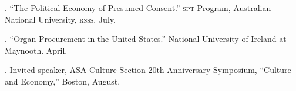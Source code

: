 \documentclass[11pt]{article}
\begin{document}
. ``The Political Economy of Presumed Consent.'' \textsc{spt} Program,
Australian National University, \textsc{rsss}. July. 

. ``Organ Procurement in the United States.'' National University of
Ireland at Maynooth. April. 

% 
% 
% 
% 
% 
% 
% 
% 
% 
% 
% 
% 
% 
% 
% 
% 
% 
% 
% 
% 
% 

\bigskip


\medskip

. Invited speaker, ASA Culture Section 20th Anniversary Symposium, ``Culture and Economy,'' Boston, August.
\end{document}

